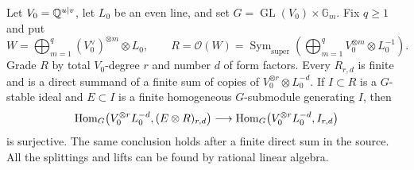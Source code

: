 \begin{lemma}
\label{c:covariant-polynomial-lifting}
Let $V_0=\mathbb Q^{u|v}$, let $L_0$ be an even line, and set
$G=\operatorname{GL}(V_0)\times\mathbb G_m$.  Fix $q\geq1$ and put
\[
 W=\bigoplus_{m=1}^{q}(V_0^\vee)^{\otimes m}\otimes L_0,
 \qquad R=\mathcal O(W)
 =\operatorname{Sym}_{\mathrm{super}}
       \left(\bigoplus_{m=1}^{q}V_0^{\otimes m}\otimes L_0^{-1}\right).
\]
Grade $R$ by total $V_0$-degree $r$ and number $d$ of form factors.
Every $R_{r,d}$ is finite and is a direct summand of a finite sum
of copies of $V_0^{\otimes r}\otimes L_0^{-d}$.
If $I\subset R$ is a $G$-stable ideal and $E\subset I$ is a finite
homogeneous $G$-submodule generating $I$, then
\begin{equation}
 \operatorname{Hom}_G\bigl(V_0^{\otimes r}L_0^{-d},(E\otimes R)_{r,d}\bigr)
 \longrightarrow
 \operatorname{Hom}_G\bigl(V_0^{\otimes r}L_0^{-d},I_{r,d}\bigr)
 \label{eq:c-polynomial-lift}
\end{equation}
is surjective.  The same conclusion holds after a finite direct
sum in the source.  All the splittings and lifts can be found by
rational linear algebra.
\end{lemma}

